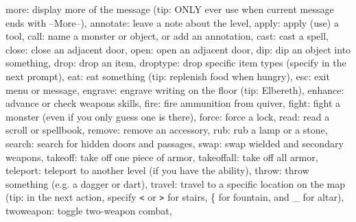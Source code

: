 {more: display more of the message (tip: ONLY ever use when current message ends with --More--),\newline
annotate: leave a note about the level,\newline
apply: apply (use) a tool,\newline
call: name a monster or object, or add an annotation,\newline
cast: cast a spell,\newline
close: close an adjacent door,\newline
open: open an adjacent door,\newline
dip: dip an object into something,\newline
drop: drop an item,\newline
droptype: drop specific item types (specify in the next prompt),\newline
eat: eat something (tip: replenish food when hungry),\newline
esc: exit menu or message,\newline
engrave: engrave writing on the floor (tip: Elbereth),\newline
enhance: advance or check weapons skills,\newline
fire: fire ammunition from quiver,\newline
fight: fight a monster (even if you only guess one is there),\newline
force: force a lock,\newline
[...]\newline
read: read a scroll or spellbook,\newline
remove: remove an accessory,\newline
rub: rub a lamp or a stone,\newline
search: search for hidden doors and passages,\newline
swap: swap wielded and secondary weapons,\newline
takeoff: take off one piece of armor,\newline
takeoffall: take off all armor,\newline
teleport: teleport to another level (if you have the ability),\newline
throw: throw something (e.g. a dagger or dart),\newline
travel: travel to a specific location on the map (tip: in the next action, specify \texttt{<} or \texttt{>} for stairs, \{ for fountain, and \_ for altar),\newline
twoweapon: toggle two-weapon combat,\newline
}
